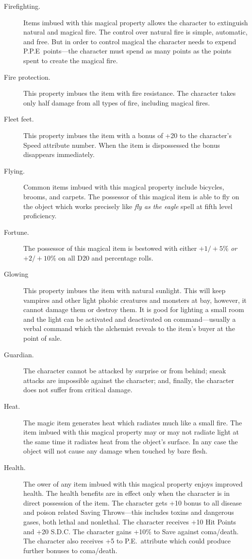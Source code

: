 \begin{description}
\item[Firefighting.]
Items imbued with this magical
property allows the character to
extinguish natural and magical
fire.
The control over natural fire is
simple, automatic, and free.
But in order to control magical
the character needs to expend
P.P.E\ points---the character
must spend as many points as
the points spent to create the
magical fire.

\item[Fire protection.] This property imbues the item with fire resistance.
The character takes only half damage from all types of fire, including magical fires.

\item[Fleet feet.] This property imbues the item with a bonus of +20 to the character's
Speed attribute number.
When the item is dispossessed the bonus disappears immediately.

\item[Flying.] Common items imbued
with this magical property include
bicycles, brooms, and carpets.
The possessor of this magical item
is able to fly on the object which works
precisely like
\emph{fly as the eagle} spell at
fifth level proficiency.

\item[Fortune.] The possessor of this magical item is bestowed with either
$+1/+5\%$ \emph{or} $+2/+10\%$ on all D20 and percentage rolls.

\item[Glowing] This property imbues the item with natural sunlight.
This will keep vampires and other light phobic creatures and monsters
at bay, however, it cannot damage them or destroy them.
It is good for lighting a small room and the light can be activated and deactivated
on command---usually a verbal command which the alchemist reveals to the item's buyer
at the point of sale.

\item[Guardian.] The character cannot be
attacked by surprise or from behind;
sneak attacks are impossible against the
character; and, finally, the character does
not suffer from critical damage.

\item[Heat.]
The magic item generates heat
which radiates much like a small
fire.
The item imbued with this magical property
may or may not radiate light at the same
time it radiates heat from the object's
surface.
In any case the object will not cause any
damage when touched by bare flesh.

\item[Health.]
The ower of any item imbued with this
magical property enjoys improved
health.
The health benefits are in effect
only when the character is in direct
possession of the item.
The character gets +10 bonus to all
disease and poison related Saving
Throws---this includes toxins and
dangerous gases,
both lethal and nonlethal.
The character receives +10 Hit Points
and +20 S.D.C.
The character gains
+10\% to Save against coma/death.
The character also receives +5 to
P.E.\ attribute which could produce
further bonuses to coma/death.


\end{description}

